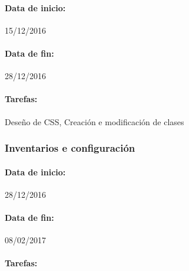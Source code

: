 \paragraph{Data de inicio:} 15/12/2016
\paragraph{Data de fin:} 28/12/2016
\paragraph{Tarefas:} Deseño de CSS, Creación e modificación de clases

\subsubsection{Inventarios e configuración}
\paragraph{Data de inicio:} 28/12/2016
\paragraph{Data de fin:} 08/02/2017
\paragraph{Tarefas:} 
